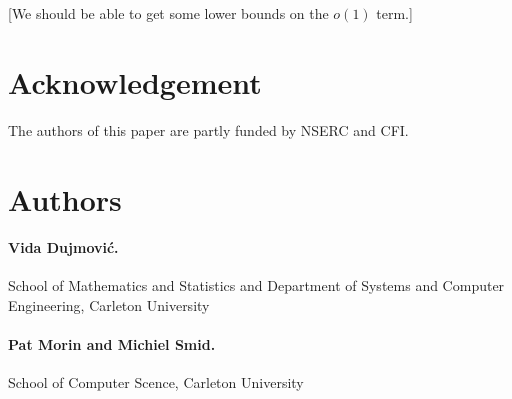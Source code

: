 \documentclass{patmorin}
\begin{document}
[We should be able to get some lower bounds on the $o(1)$ term.]


\section*{Acknowledgement}

The authors of this paper are partly funded by NSERC and CFI.

\section*{Authors}

\paragraph{Vida Dujmovi\'c.}
School of Mathematics and Statistics and Department of Systems and Computer Engineering, Carleton University

\paragraph{Pat Morin and Michiel Smid.}
School of Computer Scence, Carleton University




\end{document}
